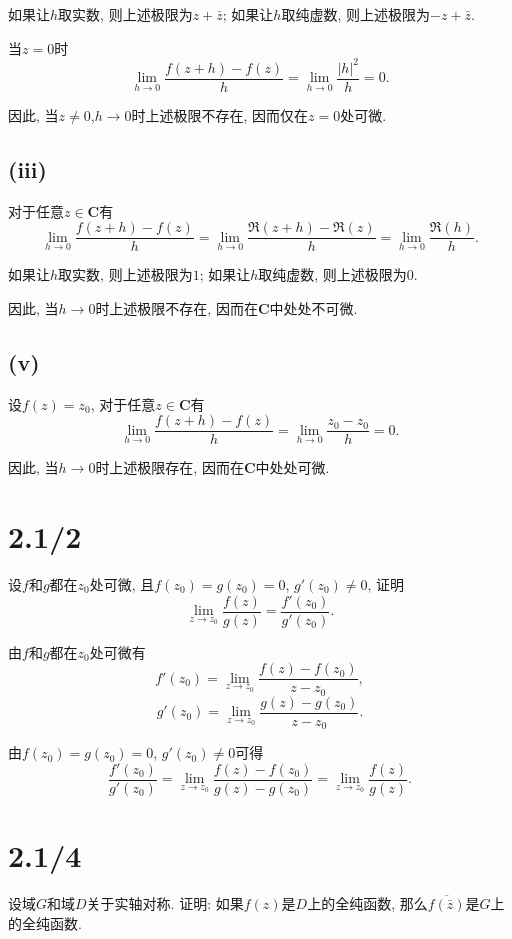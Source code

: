 \documentclass[11pt,a4paper]{article}
\begin{document}
如果让$h$取实数, 则上述极限为$z+\bar{z}$; 如果让$h$取纯虚数, 则上述极限为$-z+\bar{z}$.

当$z=0$时
$$\lim_{h\to0}\frac{f(z+h)-f(z)}{h}=\lim_{h\to0}\frac{|h|^2}{h}=0.$$

因此, 当$z\neq0$,$h\to0$时上述极限不存在, 因而仅在$z=0$处可微.

\subsection*{(iii)}

对于任意$z\in\mathbf{C}$有
$$\lim_{h\to0}\frac{f(z+h)-f(z)}{h}=\lim_{h\to0}\frac{\Re(z+h)-\Re(z)}{h}=\lim_{h\to0}\frac{\Re(h)}{h}.$$

如果让$h$取实数, 则上述极限为$1$; 如果让$h$取纯虚数, 则上述极限为$0$.

因此, 当$h\to0$时上述极限不存在, 因而在$\mathbf{C}$中处处不可微.

\subsection*{(v)}

设$f(z)=z_0$, 对于任意$z\in\mathbf{C}$有
$$\lim_{h\to0}\frac{f(z+h)-f(z)}{h}=\lim_{h\to0}\frac{z_0-z_0}{h}=0.$$

因此, 当$h\to0$时上述极限存在, 因而在$\mathbf{C}$中处处可微.

\section{2.1/2}
\begin{problem}
  设$f$和$g$都在$z_0$处可微, 且$f(z_0)=g(z_0)=0$, $g'(z_0)\neq 0$, 证明
  $$\lim_{z\to z_0}\frac{f(z)}{g(z)}=\frac{f'(z_0)}{g'(z_0)}.$$
\end{problem}

由$f$和$g$都在$z_0$处可微有
$$f'(z_0)=\lim_{z\to z_0}\frac{f(z)-f(z_0)}{z-z_0},$$
$$g'(z_0)=\lim_{z\to z_0}\frac{g(z)-g(z_0)}{z-z_0}.$$

由$f(z_0)=g(z_0)=0$, $g'(z_0)\neq 0$可得
$$\frac{f'(z_0)}{g'(z_0)}=\lim_{z\to z_0}\frac{f(z)-f(z_0)}{g(z)-g(z_0)}=\lim_{z\to z_0}\frac{f(z)}{g(z)}.$$

\section{2.1/4}
\begin{problem}
  设域$G$和域$D$关于实轴对称. 证明: 如果$f(z)$是$D$上的全纯函数, 那么$\overline{f(\bar{z})}$是$G$上的全纯函数.
\end{problem}
\end{document}
